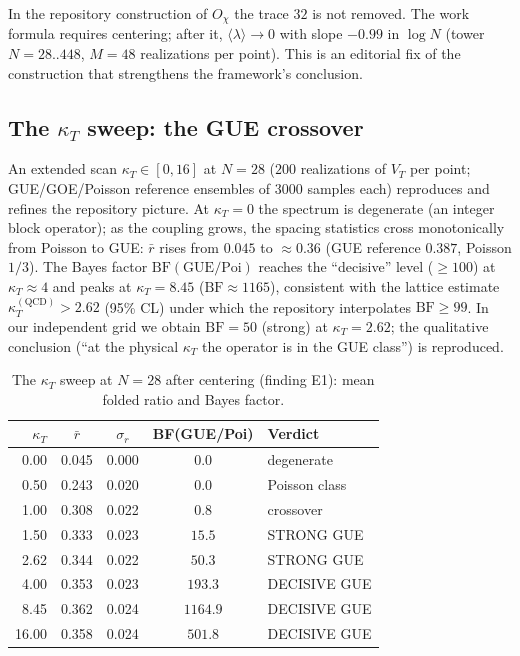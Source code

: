 \documentclass[11pt,a4paper]{article}
\begin{document}
\begin{findbox}
In the repository construction of $O_\chi$ the trace $32$ is not removed. The
work formula requires centering; after it, $\langle\lambda\rangle \to 0$ with
slope $-0.99$ in $\log N$ (tower $N = 28..448$, $M = 48$ realizations per
point). This is an editorial fix of the construction that strengthens the
framework's conclusion.
\end{findbox}

\subsection{The $\kappa_T$ sweep: the GUE crossover}

An extended scan $\kappa_T \in [0, 16]$ at $N = 28$ ($200$ realizations of
$V_T$ per point; GUE/GOE/Poisson reference ensembles of $3000$ samples each)
reproduces and refines the repository picture. At $\kappa_T = 0$ the spectrum
is degenerate (an integer block operator); as the coupling grows, the spacing
statistics cross monotonically from Poisson to GUE: $\bar r$ rises from
$0.045$ to $\approx 0.36$ (GUE reference $0.387$, Poisson $1/3$). The Bayes
factor $\mathrm{BF}(\mathrm{GUE}/\mathrm{Poi})$ reaches the ``decisive'' level
($\ge 100$) at $\kappa_T \approx 4$ and peaks at $\kappa_T = 8.45$
($\mathrm{BF} \approx 1165$), consistent with the lattice estimate
$\kappa_T^{(\mathrm{QCD})} > 2.62$ (95\% CL) under which the repository
interpolates $\mathrm{BF} \ge 99$. In our independent grid we obtain
$\mathrm{BF} = 50$ (strong) at $\kappa_T = 2.62$; the qualitative conclusion
(``at the physical $\kappa_T$ the operator is in the GUE class'') is
reproduced.

\begin{table}[htbp]
\centering\small
\caption{The $\kappa_T$ sweep at $N = 28$ after centering (finding E1): mean
folded ratio and Bayes factor.}
\label{tab:kappa}
\begin{tabular}{rcccl}
\toprule
$\kappa_T$ & $\bar r$ & $\sigma_r$ & BF(GUE/Poi) & Verdict \\
\midrule
0.00 & 0.045 & 0.000 & $0.0$ & degenerate \\
0.50 & 0.243 & 0.020 & $0.0$ & Poisson class \\
1.00 & 0.308 & 0.022 & $0.8$ & crossover \\
1.50 & 0.333 & 0.023 & $15.5$ & STRONG GUE \\
2.62 & 0.344 & 0.022 & $50.3$ & STRONG GUE \\
4.00 & 0.353 & 0.023 & $193.3$ & DECISIVE GUE \\
8.45 & 0.362 & 0.024 & $1164.9$ & DECISIVE GUE \\
16.00 & 0.358 & 0.024 & $501.8$ & DECISIVE GUE \\
\bottomrule
\end{tabular}
\end{table}
\end{document}
